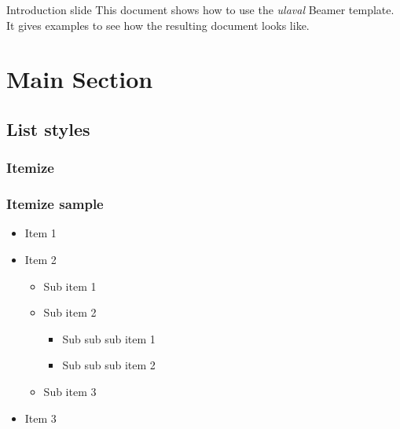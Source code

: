 \documentclass[aspectratio=169]{beamer}
\title[Titre principal qui apparait au dessus des diapositives]{}
\author[O. Côté]{\\ 
O. Côté}
\institute%
{
 École d'actuariat \\
 Université Laval, Québec, Canada \\
 \medskip
}%
\begin{document}
\sloppy


% 





\begin{frame}[label=intro]{Introduction slide}
	This document shows how to use the \emph{ulaval} Beamer template.
	It gives examples to see how the resulting document looks like.
\end{frame}

\section{Main Section}

\subsection{List styles}

\subsubsection{Itemize}

\begin{frame}[label=itemize]\frametitle{Itemize sample} 
	\begin{itemize}
		\item Item 1
		\item Item 2
		\begin{itemize}
			\item Sub item 1
			\item Sub item 2
			\begin{itemize}
				\item Sub sub sub item 1
				\item Sub sub sub item 2
			\end{itemize}
			\item Sub item 3
		\end{itemize}
		\item Item 3
	\end{itemize}
\end{frame}
\end{document}
